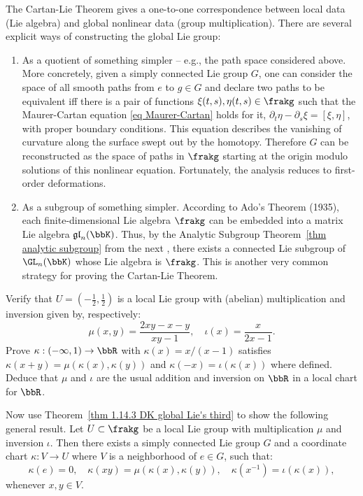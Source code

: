 \begin{rem}\label{rem Lie III}
    The Cartan-Lie Theorem gives a one-to-one correspondence between local data (Lie algebra) and global nonlinear data (group multiplication). There are several explicit ways of constructing the global Lie group:
    \begin{enumerate}
        \item As a quotient of something simpler -- e.g., the path space considered above. More concretely, given a simply connected Lie group $G$, one can consider the space of all smooth paths from $e$ to $g\in G$ and declare two paths to be equivalent iff there is a pair of functions $\xi(t,s),\eta(t,s)\in\frakg$ such that the Maurer-Cartan equation \eqref{eq Maurer-Cartan} holds for it, $\partial_t\eta-\partial_s\xi=[\xi,\eta]$, with proper boundary conditions. This equation describes the vanishing of curvature along the surface swept out by the homotopy. Therefore $G$ can be reconstructed as the space of paths in $\frakg$ starting at the origin modulo solutions of this nonlinear equation. Fortunately, the analysis reduces to first-order deformations.

        \item As a subgroup of something simpler. According to Ado's Theorem (1935), each finite-dimensional Lie algebra $\frakg$ can be embedded into a matrix Lie algebra $\mathfrak{gl}_n(\bbK)$. Thus, by the Analytic Subgroup Theorem\ \ref{thm analytic subgroup} from the next \sect, there exists a connected Lie subgroup of $\GL_n(\bbK)$ whose Lie algebra is $\frakg$. This is another very common strategy for proving the Cartan-Lie Theorem.
    \end{enumerate}
\end{rem}


\begin{xca}
    Verify that $U=(-\frac12,\frac12)$ is a local Lie group with (abelian) multiplication and inversion given by, respectively:
    \[\mu(x,y)=\frac{2xy-x-y}{xy-1},\quad \iota(x)=\frac{x}{2x-1}.\]
    Prove $\kappa:(-\infty,1)\to \bbR$ with $\kappa(x)=x/(x-1)$ satisfies $\kappa(x+y)=\mu(\kappa(x),\kappa(y))$ and $\kappa(-x)=\iota(\kappa(x))$ where defined. Deduce that $\mu$ and $\iota$ are the usual addition and inversion on $\bbR$ in a local chart for $\bbR$. 

    Now use Theorem~\ref{thm 1.14.3 DK global Lie's third} to show the following general result. Let $U\subset \frakg$ be a local Lie group with multiplication $\mu$ and inversion $\iota$. Then there exists a simply connected Lie group $G$ and a coordinate chart $\kappa:V\to U$ where $V$ is a neighborhood of $e\in G$, such that:
    \[\kappa(e)=0,\quad \kappa(xy)=\mu(\kappa(x),\kappa(y)),\quad\kappa(x^{-1})=\iota(\kappa(x)),\]
    whenever $x,y\in V$.
\end{xca}






